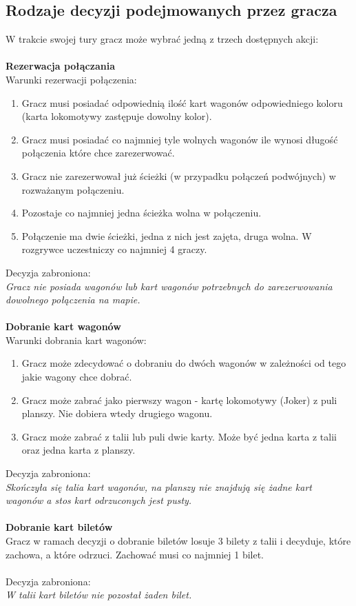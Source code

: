\documentclass[12pt, oneside]{report}
\begin{document}
	\subsection{Rodzaje decyzji podejmowanych przez gracza}
	W trakcie swojej tury gracz może wybrać jedną z trzech dostępnych akcji: \\ \\
	\textbf{Rezerwacja połączania} \\
	Warunki rezerwacji połączenia:
	\begin{enumerate}
		\item Gracz musi posiadać odpowiednią ilość kart wagonów odpowiedniego koloru (karta lokomotywy zastępuje dowolny kolor).
		\item Gracz musi posiadać co najmniej tyle wolnych wagonów ile wynosi długość połączenia które chce zarezerwować.
		\item Gracz nie zarezerwował już ścieżki (w przypadku połączeń podwójnych) w rozważanym połączeniu.
		\item Pozostaje co najmniej jedna ścieżka wolna w połączeniu.
		\item Połączenie ma dwie ścieżki, jedna z nich jest zajęta, druga wolna. W rozgrywce uczestniczy co najmniej 4 graczy.
	\end{enumerate}
	Decyzja zabroniona: \\
	\textit{Gracz nie posiada wagonów lub kart wagonów potrzebnych do zarezerwowania dowolnego połączenia na mapie.} \\ \\
	\textbf{Dobranie kart wagonów} \\
	Warunki dobrania kart wagonów:
	\begin{enumerate}
		\item Gracz może zdecydować o dobraniu do dwóch wagonów w zależności od tego jakie wagony chce dobrać. 
		\item Gracz może zabrać jako pierwszy wagon - kartę lokomotywy (Joker) z puli planszy. Nie dobiera wtedy drugiego wagonu.
		\item Gracz może zabrać z talii lub puli dwie karty. Może być jedna karta z talii oraz jedna karta z planszy.
	\end{enumerate}
	Decyzja zabroniona: \\
	\textit{Skończyła się talia kart wagonów, na planszy nie znajdują się żadne kart wagonów a stos kart odrzuconych jest pusty.} \\ \\
	\textbf{Dobranie kart biletów} \\
	Gracz w ramach decyzji o dobranie biletów losuje 3 bilety z talii i decyduje, które zachowa, a które odrzuci. Zachować musi co najmniej 1 bilet. \\ \\
	Decyzja zabroniona:\\
	\textit{W talii kart biletów nie pozostał żaden bilet.}
\end{document}
